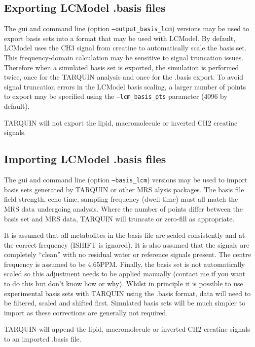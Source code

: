 \documentclass[a4paper,12pt]{article}
\begin{document}
\subsection{Exporting LCModel .basis files}
The gui and command line (option \texttt{---output\_basis\_lcm}) versions may be used to export basis sets into a format that may be used with LCModel. By default, LCModel uses the CH3 signal from creatine to automatically scale the basis set. This frequency-domain calculation may be sensitive to signal truncation issues. Therefore when a simulated basis set is exported, the simulation is performed twice, once for the TARQUIN analysis and once for the .basis export. To avoid signal truncation errors in the LCModel basis scaling, a larger number of points to export may be specified using the \texttt{---lcm\_basis\_pts} parameter (4096 by default).

TARQUIN will not export the lipid, macromolecule or inverted CH2 creatine signals.

\subsection{Importing LCModel .basis files}
The gui and command line (option \texttt{---basis\_lcm}) versions may be used to import basis sets generated by TARQUIN or other MRS alysis packages. The basis file field strength, echo time, sampling frequency (dwell time) must all match the MRS data undergoing analysis. Where the number of points differ between the basis set and MRS data, TARQUIN will truncate or zero-fill as appropriate.

It is assumed that all metabolites in the basis file are scaled consistently and at the correct frequency (ISHIFT is ignored). It is also assumed that the signals are completely ``clean'' with no residual water or reference signals present. The centre frequency is assumed to be 4.65PPM. Finally, the basis set is not automatically scaled so this adjustment needs to be applied manually (contact me if you want to do this but don't know how or why). Whilst in principle it is possible to use experimental basis sets with TARQUIN using the .basis format, data will need to be filtered, scaled and shifted first. Simulated basis sets will be much simpler to import as these corrections are generally not required.

TARQUIN will append the lipid, macromolecule or inverted CH2 creatine signals to an imported .basis file.
\end{document}
